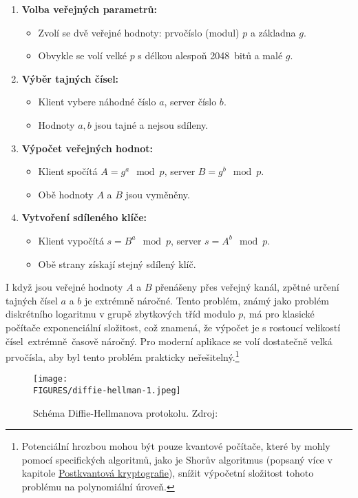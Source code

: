 \begin{enumerate}
  \item \textbf{Volba veřejných parametrů:}
    \begin{itemize}
      \item Zvolí se dvě veřejné hodnoty: prvočíslo (modul) \( p \) a základna \( g \).
      \item Obvykle se volí velké \( p \) s délkou alespoň 2048~bitů a malé \( g \).
    \end{itemize}

  \item \textbf{Výběr tajných čísel:}
    \begin{itemize}
      \item Klient vybere náhodné číslo \( a \), server číslo \( b \).
      \item Hodnoty \( a, b \) jsou tajné a nejsou sdíleny.
    \end{itemize}

  \item \textbf{Výpočet veřejných hodnot:}
    \begin{itemize}
      \item Klient spočítá \( A = g^a \mod p \), server \( B = g^b \mod p \).
      \item Obě hodnoty \( A \) a \( B \) jsou vyměněny.
    \end{itemize}

  \item \textbf{Vytvoření sdíleného klíče:}
    \begin{itemize}
      \item Klient vypočítá \( s = B^a \mod p \), server \( s = A^b \mod p \).
      \item Obě strany získají stejný sdílený klíč.
    \end{itemize}
\end{enumerate}

I když jsou veřejné hodnoty \(A\) a \(B\) přenášeny přes veřejný kanál, zpětné určení tajných čísel \(a\) a \(b\) je extrémně náročné. Tento problém, známý jako problém diskrétního logaritmu v grupě zbytkových tříd modulo \(p\), má pro klasické počítače exponenciální složitost, což znamená, že výpočet je s rostoucí velikostí čísel~extrémně~časově náročný. Pro moderní aplikace se volí dostatečně velká prvočísla, aby byl tento problém prakticky neřešitelný.\footnote{  Potenciální hrozbou mohou být pouze kvantové počítače, které by mohly pomocí specifických algoritmů, jako je Shorův algoritmus (popsaný více v kapitole \hyperref[sec:postkvantova-kryptografie]{Postkvantová kryptografie}), snížit výpočetní složitost tohoto problému na polynomiální úroveň.}

\begin{figure}[htbp]
    \centering
    \texttt{[image: \\FIGURES/diffie-hellman-1.jpeg]}
    \caption{Schéma Diffie-Hellmanova protokolu. Zdroj: \parencite{diffie-hellman-1}}
    \label{fig:diffie-hellman}
  \end{figure}

\newpage